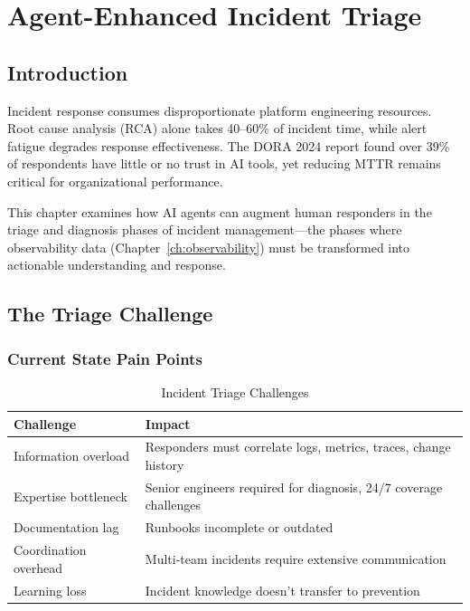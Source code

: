 \chapter{Agent-Enhanced Incident Triage}
\label{ch:triage}


\section{Introduction}
\label{sec:triage-intro}

Incident response consumes disproportionate platform engineering resources. Root cause analysis (RCA) alone takes 40--60\% of incident time, while alert fatigue degrades response effectiveness. The DORA 2024 report found over 39\% of respondents have little or no trust in AI tools, yet reducing MTTR remains critical for organizational performance.

This chapter examines how AI agents can augment human responders in the triage and diagnosis phases of incident management---the phases where observability data (Chapter~\ref{ch:observability}) must be transformed into actionable understanding and response.

\section{The Triage Challenge}
\label{sec:triage-challenge}

\subsection{Current State Pain Points}
\label{subsec:pain-points}

\begin{table}[htbp]
\centering
\caption{Incident Triage Challenges}
\label{tab:triage-challenges}
\begin{tabular}{ll}
\toprule
\textbf{Challenge} & \textbf{Impact} \\
\midrule
Information overload & Responders must correlate logs, metrics, traces, change history \\
Expertise bottleneck & Senior engineers required for diagnosis, 24/7 coverage challenges \\
Documentation lag & Runbooks incomplete or outdated \\
Coordination overhead & Multi-team incidents require extensive communication \\
Learning loss & Incident knowledge doesn't transfer to prevention \\
\bottomrule
\end{tabular}
\end{table}

